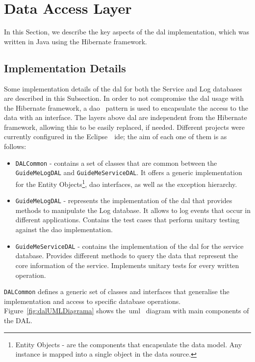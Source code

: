 \section{Data Access Layer}
\label{sec:dal}
In this Section, we describe the key aspects of the \gls{dal} implementation, which was written in Java using the Hibernate framework.

\subsection{Implementation Details}
\label{subsec:logDbDAL}
Some implementation details of the \gls{dal} for both the Service and Log databases are described in this Subsection. In order to not compromise the \gls{dal} usage with the Hibernate framework, a \gls{dao}~\cite{dao} pattern is used to encapsulate the access to the data with an interface. The layers above \gls{dal} are independent from the Hibernate framework, allowing this to be easily replaced, if needed. Different projects were currently configured in the Eclipse~\cite{eclipse}~\gls{ide}; the aim of each one of them is as follows:
\begin{itemize}
\item \verb"DALCommon" - contains a set of classes that are common between the \verb"GuideMeLogDAL" and \verb"GuideMeServiceDAL". It offers a generic implementation for the Entity Objects\footnote{Entity Objects - are the components that encapsulate the data model. Any instance is mapped into a single object in the data source.}, \gls{dao} interfaces, as well as the exception hierarchy.
\item \verb"GuideMeLogDAL" - represents the implementation of the \gls{dal} that provides methods to manipulate the Log database. It allows to log events that occur in different applications. Contains the test cases that perform unitary testing against the \gls{dao} implementation.
\item \verb"GuideMeServiceDAL" - contains the implementation of the \gls{dal} for the service database. Provides different methods to query the data that represent the core information of the service. Implements unitary tests for every written operation.
\end{itemize}
\verb"DALCommon" defines a generic set of classes and interfaces that generalise the implementation and access to specific database operations. Figure~\ref{fig:dalUMLDiagrama} shows the~\gls{uml}~\cite{umlLanguage} diagram with main components of the DAL. 
